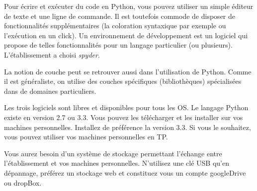Pour écrire et exécuter du code en Python, vous pouvez utiliser un simple éditeur de texte et une ligne de commande. Il est toutefois commode de disposer de fonctionnalités supplémentaires (la coloration syntaxique par exemple ou l'exécution en un click). Un environnement de développement est un logiciel qui propose de telles fonctionnalités pour un langage particulier (ou plusieurs). L'établissement a choisi \emph{spyder}.

La notion de couche peut se retrouver aussi dans l'utilisation de Python. Comme il est généraliste, on utilise des couches spécifiques (bibliothèques) spécialisées dans de domaines particuliers.

Les trois logiciels sont libres et disponibles pour tous les OS. Le langage Python existe en version 2.7 ou 3.3. Vous pouvez les télécharger et les installer sur vos machines personnelles. Installez de préférence la version 3.3.  Si vous le souhaitez, vous pouvez utiliser vos machines personnelles en TP.

Vous aurez besoin d'un système de stockage permettant l'échange entre l'établissement et vos machines personnelles. N'utilisez une clé USB qu'en dépannage, préférez un stockage web et constituez vous un compte googleDrive ou dropBox.

